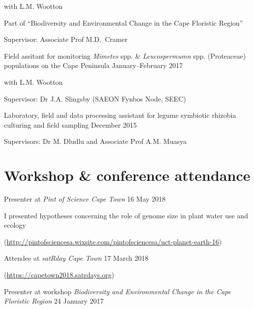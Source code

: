 \documentclass[]{article}
\begin{document}
\par

with L.M. Wootton

\par

Part of ``Biodiversity and Environmental Change in the Cape Floristic
Region''

\par

Supervisor: Associate Prof M.D.~Cramer

Field assitant for monitoring \emph{Mimetes} spp. \&
\emph{Leucospermumn} spp. (Proteaceae) populations on the Cape Peninsula
\hfill January--February 2017

\par

with L.M. Wootton

\par

Supervisor: Dr J.A. Slingsby (SAEON Fynbos Node, SEEC)

Laboratory, field and data processing assistant for legume symbiotic
rhizobia culturing and field sampling \hfill December 2015

\par

Supervisors: Dr M. Dludlu and Associate Prof A.M. Muasya

\hypertarget{workshop-conference-attendance}{%
\section{Workshop \& conference
attendance}\label{workshop-conference-attendance}}

Presenter at \emph{Pint of Science Cape Town} \hfill 16 May 2018

\par

I presented hypotheses concerning the role of genome size in plant water
use and ecology

\par [pintofsciencesa.wixsite.com]

(\url{http://pintofsciencesa.wixsite.com/pintofsciencesa/uct-planet-earth-16})

Attendee at \emph{satRday Cape Town} \hfill 17 March 2018

\par [capetown2018.satrdays.org]

(\url{https://capetown2018.satrdays.org})

Presenter at workshop \emph{Biodiversity and Environmental Change in the
Cape Floristic Region} \hfill 24 January 2017
\end{document}
